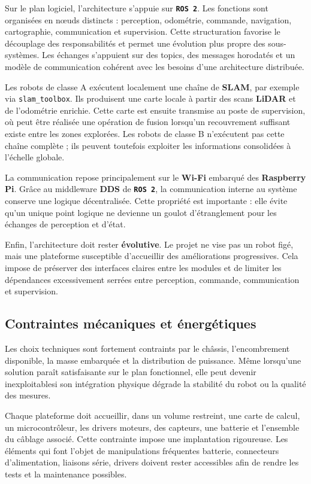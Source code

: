 \documentclass[11pt,a4paper]{report}
\newcommand{\kw}[1]{\textbf{#1}}
\newcommand{\outil}[1]{\textbf{\texttt{#1}}}
\begin{document}
Sur le plan logiciel, l’architecture s’appuie sur \outil{ROS 2}. Les fonctions sont organisées en nœuds distincts : perception, odométrie, commande, navigation, cartographie, communication et supervision. Cette structuration favorise le découplage des responsabilités et permet une évolution plus propre des sous-systèmes. Les échanges s’appuient sur des topics, des messages horodatés et un modèle de communication cohérent avec les besoins d’une architecture distribuée.

Les robots de classe A exécutent localement une chaîne de \kw{SLAM}, par exemple via \texttt{slam\_toolbox}. Ils produisent une carte locale à partir des scans \kw{LiDAR} et de l’odométrie enrichie. Cette carte est ensuite transmise au poste de supervision, où peut être réalisée une opération de fusion lorsqu’un recouvrement suffisant existe entre les zones explorées. Les robots de classe B n’exécutent pas cette chaîne complète ; ils peuvent toutefois exploiter les informations consolidées à l’échelle globale.

La communication repose principalement sur le \kw{Wi-Fi} embarqué des \kw{Raspberry Pi}. Grâce au middleware \kw{DDS} de \outil{ROS 2}, la communication interne au système conserve une logique décentralisée. Cette propriété est importante : elle évite qu’un unique point logique ne devienne un goulot d’étranglement pour les échanges de perception et d’état.

Enfin, l’architecture doit rester \kw{évolutive}. Le projet ne vise pas un robot figé, mais une plateforme susceptible d’accueillir des améliorations progressives. Cela impose de préserver des interfaces claires entre les modules et de limiter les dépendances excessivement serrées entre perception, commande, communication et supervision.

\subsection{Contraintes mécaniques et énergétiques}

Les choix techniques sont fortement contraints par le châssis, l’encombrement disponible, la masse embarquée et la distribution de puissance. Même lorsqu’une solution paraît satisfaisante sur le plan fonctionnel, elle peut devenir inexploitablesi son intégration physique dégrade la stabilité du robot ou la qualité des mesures.

Chaque plateforme doit accueillir, dans un volume restreint, une carte de calcul, un microcontrôleur, les drivers moteurs, des capteurs, une batterie et l’ensemble du câblage associé. Cette contrainte impose une implantation rigoureuse. Les éléments qui font l’objet de manipulations fréquentes  batterie, connecteurs d’alimentation, liaisons série, drivers  doivent rester accessibles afin de rendre les tests et la maintenance possibles.
\end{document}
